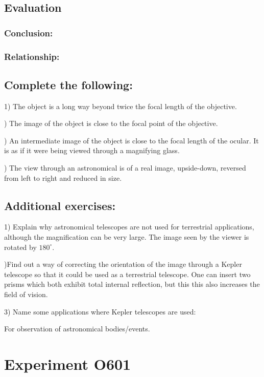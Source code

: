 \documentclass[12pt]{article}
\begin{document}
\subsection*{Evaluation}

\subsubsection*{Conclusion:}

\subsubsection*{Relationship:}

\subsection*{Complete the following:}

1) The object is a long way beyond twice the focal length of the objective.

) The image of the object is close to the focal point of the objective.

) An intermediate image of the object is close to the focal length of the ocular. It is as if it were being
viewed through a magnifying glass.

) The view through an astronomical is of a real image, upside-down, reversed from left to right and
reduced in size.

\subsection*{Additional exercises:}

1) Explain why astronomical telescopes are not used for terrestrial applications, although the magnification
can be very large.
The image seen by the viewer is rotated by $180^{\circ}$.

)Find out a way of correcting the orientation of the image through a Kepler telescope so that it could be
used as a terrestrial telescope. One can insert two prisms which both exhibit total internal reflection, but this this also increases the field of vision.

3) Name some applications where Kepler telescopes are used:

For observation of astronomical bodies/events.

\newpage

\section*{Experiment O601}
\end{document}
